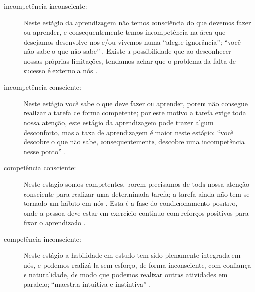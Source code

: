 \begin{description}
\item[incompetência inconsciente:] Neste estágio da aprendizagem não temos consciência do que devemos fazer ou aprender,
\label{ref:IncompetenciaInconsciente}
e consequentemente temos incompetência na área que desejamos desenvolve-nos e/ou vivemos numa ``alegre ignorância'';
``você não sabe o que não sabe'' \cite[pp. 29, 252]{seymourtreinando} \cite{carnegie2014lideranca} \cite{de2013treinamentos}.
Existe a possibilidade que ao desconhecer nossas próprias limitações,
tendamos achar que o problema da falta de sucesso é externo a nós \cite[pp. 10]{passadori7}.
\item[incompetência consciente:] Neste estágio você sabe o que deve fazer ou aprender,
\label{ref:IncompetenciaConsciente}
porem não consegue realizar a tarefa de forma competente;
por este motivo a tarefa exige toda nossa atenção, 
este estágio da aprendizagem pode trazer algum desconforto,
mas a taxa de aprendizagem é maior neste estágio;
``você descobre o que não sabe, consequentemente, descobre uma incompetência nesse ponto''
\cite[pp. 29]{seymourtreinando} \cite{carnegie2014lideranca} \cite[pp. 10, 11]{passadori7} \cite{de2013treinamentos}.
\item[competência consciente:] 
\label{ref:CompetenciaConsciente}
Neste estagio somos competentes, 
porem precisamos de toda nossa atenção consciente 
para realizar uma determinada tarefa; a tarefa ainda não tem-se tornado um hábito em nós 
\cite[pp. 30, 249]{seymourtreinando} \cite{carnegie2014lideranca} \cite{de2013treinamentos}.
Esta é a fase do condicionamento positivo,
onde a pessoa deve estar em exercício continuo com reforços positivos para fixar o aprendizado \cite[pp. 11]{passadori7}.
\item[competência inconsciente:] 
\label{ref:CompetenciaInconsciente}
Neste estágio a habilidade em estudo tem sido plenamente integrada em nós, 
e podemos realizá-la sem esforço, de forma inconsciente, com confiança e naturalidade, 
de modo que podemos realizar outras atividades em paralelo;
``maestria intuitiva e instintiva'' \cite[pp. 30, 249]{seymourtreinando} \cite[pp. 11]{passadori7} \cite{de2013treinamentos}.
\end{description}


